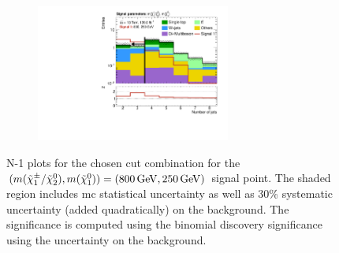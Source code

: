 \begin{figure}
\begin{subfigure}[b]{0.5\linewidth}
		\caption{}
	\end{subfigure}\hfill
	\begin{subfigure}[b]{0.5\linewidth}
		\centering\includegraphics[width=0.7\textwidth]{N-1_cut_scan/n1_800_250/nJet30}
		\caption{}
	\end{subfigure}

	\caption[N-1 plots for the chosen cut combination for the (800, 250) signal point]{N-1 plots for the chosen cut combination for the $(m(\charg/\neutr), m(\lsp)) = (\SI{800}{\GeV}, \SI{250}{\GeV})$ signal point. The shaded region includes \gls{mc} statistical uncertainty as well as 30\% systematic uncertainty (added quadratically) on the background. The significance is computed using the binomial discovery significance using the uncertainty on the background.}
	\label{fig:results_n1_800_250}
\end{figure}

